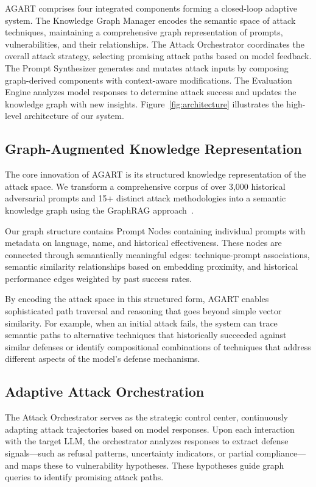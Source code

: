 AGART comprises four integrated components forming a closed-loop adaptive system. The Knowledge Graph Manager encodes the semantic space of attack techniques, maintaining a comprehensive graph representation of prompts, vulnerabilities, and their relationships. The Attack Orchestrator coordinates the overall attack strategy, selecting promising attack paths based on model feedback. The Prompt Synthesizer generates and mutates attack inputs by composing graph-derived components with context-aware modifications. The Evaluation Engine analyzes model responses to determine attack success and updates the knowledge graph with new insights. Figure~\ref{fig:architecture} illustrates the high-level architecture of our system.

\subsection{Graph-Augmented Knowledge Representation}

The core innovation of AGART is its structured knowledge representation of the attack space. We transform a comprehensive corpus of over 3,000 historical adversarial prompts and 15+ distinct attack methodologies into a semantic knowledge graph using the GraphRAG approach~\cite{GraphRAG}. 

Our graph structure contains Prompt Nodes containing individual prompts with metadata on language, name, and historical effectiveness. These nodes are connected through semantically meaningful edges: technique-prompt associations, semantic similarity relationships based on embedding proximity, and historical performance edges weighted by past success rates.

By encoding the attack space in this structured form, AGART enables sophisticated path traversal and reasoning that goes beyond simple vector similarity. For example, when an initial attack fails, the system can trace semantic paths to alternative techniques that historically succeeded against similar defenses or identify compositional combinations of techniques that address different aspects of the model's defense mechanisms.

\subsection{Adaptive Attack Orchestration}
The Attack Orchestrator serves as the strategic control center, continuously adapting attack trajectories based on model responses. Upon each interaction with the target LLM, the orchestrator analyzes responses to extract defense signals—such as refusal patterns, uncertainty indicators, or partial compliance—and maps these to vulnerability hypotheses. These hypotheses guide graph queries to identify promising attack paths.

